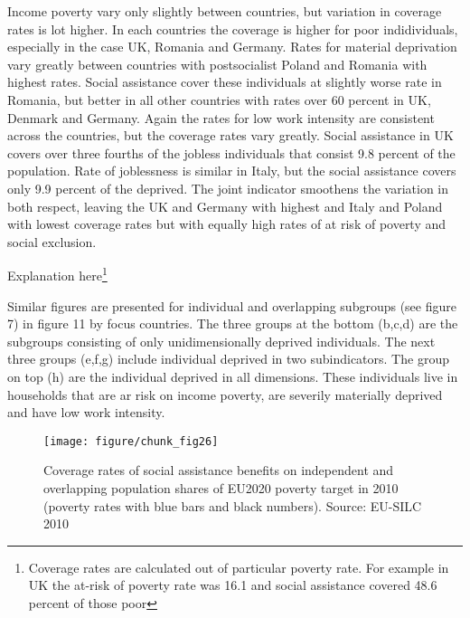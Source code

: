 \documentclass[11pt, a4paper]{article}\usepackage{graphicx, color}
\makeatletter
\def\maxwidth{ %
  \ifdim\Gin@nat@width>\linewidth
    \linewidth
  \else
    \Gin@nat@width
  \fi
}
\newenvironment{knitrout}{}{} %
\makeatother
\begin{document}
Income poverty vary only slightly between countries, but variation in coverage rates is lot higher. In each countries the coverage is higher for poor indidividuals, especially in the case UK, Romania and Germany. Rates for material deprivation vary greatly between countries with postsocialist Poland and Romania with highest rates. Social assistance cover these individuals at slightly worse rate in Romania, but better in all other countries with rates over 60 percent in UK, Denmark and Germany. Again the rates for low work intensity are consistent across the countries, but the coverage rates vary greatly. Social assistance in UK covers over three fourths of the jobless individuals that consist 9.8 percent of the population. Rate of joblessness is similar in Italy, but the social assistance covers only 9.9 percent of the deprived. The joint indicator smoothens the variation in both respect, leaving the UK and Germany with highest and Italy and Poland with lowest coverage rates but with equally high rates of at risk of poverty and social exclusion.

Explanation here\footnote{Coverage rates are calculated out of particular poverty rate. For example in UK the at-risk of poverty rate was 16.1 and social assistance covered 48.6 percent of those poor}

Similar figures are presented for individual and overlapping subgroups (see figure 7) in figure 11 by focus countries. The three groups at the bottom (b,c,d) are the  subgroups consisting of only unidimensionally deprived individuals. The next three groups (e,f,g) include individual deprived in two subindicators. The group on top (h) are the individual deprived in all dimensions. These individuals live in households that are ar risk on income poverty, are severily materially deprived and have low work intensity.

\begin{knitrout}
\color{fgcolor}\begin{figure}[H]
\texttt{[image: figure/chunk\_fig26]} \caption[Coverage rates of social assistance benefits on independent and overlapping population shares of EU2020 poverty target in 2010 (poverty rates with blue bars and black numbers)]{Coverage rates of social assistance benefits on independent and overlapping population shares of EU2020 poverty target in 2010 (poverty rates with blue bars and black numbers). Source: EU-SILC 2010\label{fig:chunk_fig26}}
\end{figure}

\end{knitrout}
\end{document}

